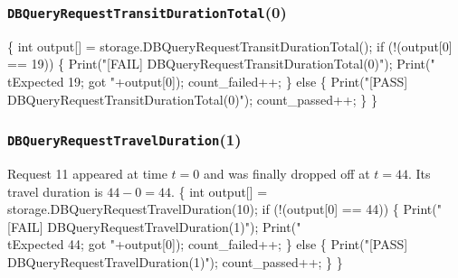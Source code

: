 \documentclass{article}
\def\nwendcode{\endtrivlist \endgroup}
\let\nwdocspar=\par
\theoremstyle{definition}
\begin{document}
\subsubsection{{\tt{}DBQueryRequestTransitDurationTotal}(0)}
\nwenddocs{}\endmoddef{}
\{
  int output[] = storage.DBQueryRequestTransitDurationTotal();
  if (!(output[0] == 19)) \{
    Print("[FAIL] DBQueryRequestTransitDurationTotal(0)");
    Print("\\tExpected 19; got "+output[0]);
    count_failed++;
  \} else \{
    Print("[PASS] DBQueryRequestTransitDurationTotal(0)");
    count_passed++;
  \}
\}
\nwendcode{}\nwdocspar
\subsubsection{{\tt{}DBQueryRequestTravelDuration}(1)}
Request 11 appeared at time $t=0$ and was finally dropped off at $t=44$. Its
travel duration is $44-0=44$.
\nwenddocs{}\endmoddef{}
\{
  int output[] = storage.DBQueryRequestTravelDuration(10);
  if (!(output[0] == 44)) \{
    Print("[FAIL] DBQueryRequestTravelDuration(1)");
    Print("\\tExpected 44; got "+output[0]);
    count_failed++;
  \} else \{
    Print("[PASS] DBQueryRequestTravelDuration(1)");
    count_passed++;
  \}
\}
\nwendcode{}\nwdocspar
\end{document}
